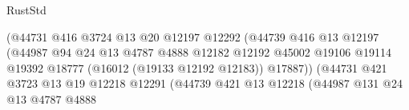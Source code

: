 \begin{lexlean}{RustStd}
\begin{coremodule}
                                                  (@44731
                                                    @416
                                                    @3724
                                                    @13
                                                    @20
                                                    @12197
                                                    @12292
                                                    (@44739
                                                      @416
                                                      @13
                                                      @12197
                                                      (@44987
                                                        @94
                                                        @24
                                                        @13
                                                        @4787
                                                        @4888
                                                        @12182
                                                        @12192
                                                        @45002
                                                        @19106
                                                        @19114
                                                        @19392
                                                        @18777
                                                        (@16012 (@19133 @12192 @12183))
                                                        @17887))
                                                    (@44731
                                                      @421
                                                      @3723
                                                      @13
                                                      @19
                                                      @12218
                                                      @12291
                                                      (@44739
                                                        @421
                                                        @13
                                                        @12218
                                                        (@44987
                                                          @131
                                                          @24
                                                          @13
                                                          @4787
                                                          @4888

\end{coremodule}
\end{lexlean}
